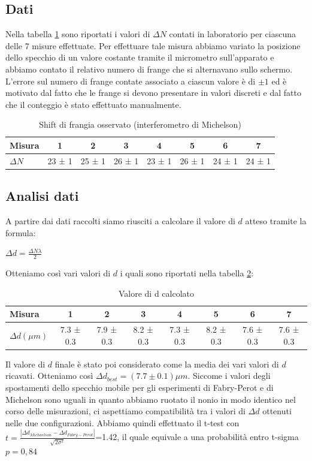 \documentclass[a4paper]{article}
\begin{document}
\subsection{Dati}
Nella tabella \ref{tab: micrometro Michaelson} sono riportati i valori di $\Delta N$ contati in laboratorio per ciascuna delle 7 misure effettuate. Per effettuare tale misura abbiamo variato la posizione dello specchio di un valore costante tramite il micrometro sull'apparato e abbiamo contato il relativo numero di frange che si alternavano sullo schermo. L'errore sul numero di frange contate associato a ciascun valore è di $\pm1$ ed è motivato dal fatto che le frange si devono presentare in valori discreti e dal fatto che il conteggio è stato effettuato manualmente. 
\begin{table}[htbp]
\centering
\caption{Shift di frangia osservato (interferometro di Michelson)}
\begin{tabular}{|l|ccccccc|}
\hline
Misura & 1 & 2 & 3 & 4 & 5 & 6 & 7 \\\hline\hline
$\Delta N$ & 23 ± 1 & 25 ± 1 & 26 ± 1 & 23 ± 1 & 26 ± 1 & 24 ± 1 & 24 ± 1 \\\hline
\end{tabular}
\label{tab: micrometro Michaelson}
\end{table}
\subsection{Analisi dati}
A partire dai dati raccolti siamo riusciti a calcolare il valore di $d$ atteso tramite la formula: 
\begin{center}
    $\Delta d=\frac{\Delta N \lambda}{2}$
\end{center}
Otteniamo così vari valori di $d$ i quali sono riportati nella tabella \ref{tab: valori d michaelson}:
\begin{table}[htbp]
\centering
\caption{Valore di d calcolato}
\begin{tabular}{|l|ccccccc|}
\hline
Misura & 1 & 2 & 3 & 4 & 5 & 6 & 7 \\\hline\hline
$\Delta d(\mu m)$ & 7.3 ± 0.3 & 7.9 ± 0.3 & 8.2 ± 0.3 & 7.3 ± 0.3 & 8.2 ± 0.3 & 7.6 ± 0.3 & 7.6 ± 0.3 \\\hline
\end{tabular}
\label{tab: valori d michaelson}
\end{table} 
Il valore di $d$ finale è stato poi considerato come la media dei vari valori di $d$ ricavati. Otteniamo così $\Delta d_{best}=(7.7\pm0.1 )\mu m$.
Siccome i valori degli spostamenti dello specchio mobile per gli esperimenti di Fabry-Perot e di Michelson sono uguali in quanto abbiamo ruotato il nonio in modo identico nel corso delle misurazioni, ci aspettiamo compatibilità tra i valori di $\Delta d$ ottenuti nelle due configurazioni. Abbiamo quindi effettuato il t-test con $t=\frac{|\Delta d_{Michaelson}-\Delta d_{Fabry-Perot}|}{\sqrt{2\sigma^2}}$=1.42, il quale equivale a una probabilità entro t-sigma $p=0,84$
\end{document}
